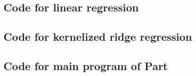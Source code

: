\documentclass[A4,12pt]{article}
\begin{document}
\subsection*{Code for linear regression}
\clearpage
\subsection*{Code for kernelized ridge regression}
\clearpage
\subsection*{Code for main program of Part \uppercase\expandafter{}}
\end{document}
